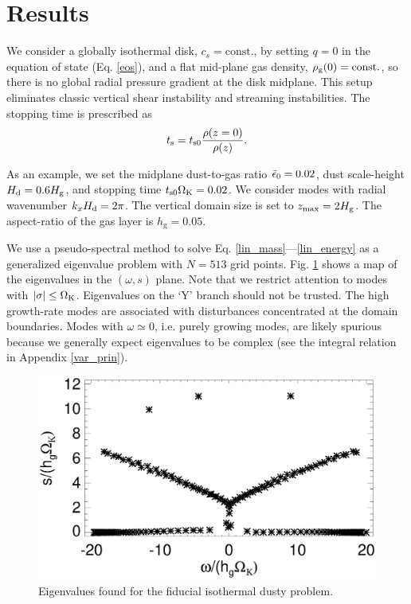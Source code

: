 \section{Results}

We consider a globally isothermal disk, $c_s=\mathrm{const.}$, by
setting $q=0$ in the equation of state (Eq. \ref{eos}), and a flat
mid-plane gas density, $\rho_\mathrm{g}(0) = \mathrm{const.}$, so there is no
global radial pressure gradient at the disk midplane. This setup
eliminates classic vertical shear instability and streaming
instabilities. The stopping time is
prescribed as 
\begin{align}
  t_\mathrm{s} = t_\mathrm{s0}\frac{\rho(z=0)}{\rho(z)}. 
\end{align}

As an example, we set the midplane dust-to-gas ratio 
$\tilde{\epsilon}_0=0.02$, dust scale-height $H_\mathrm{d}=0.6H_\mathrm{g}$, and
stopping time $t_\mathrm{s0}\Omega_{\rm K}=0.02$. We consider modes with radial
wavenumber $k_xH_\mathrm{d}=2\pi$. The vertical domain size is set to  
$z_\mathrm{max}=2H_\mathrm{g}$. The aspect-ratio of the gas layer is
$h_\mathrm{g}=0.05$. 

We use a pseudo-spectral method to solve  
Eq. \ref{lin_mass}---\ref{lin_energy} as a generalized eigenvalue
problem with $N=513$ grid points. Fig. \ref{eigen_map}   
shows a map of the eigenvalues in the $(\omega, s)$ plane. Note that
we restrict attention to modes with $|\sigma|\leq \Omega_{\rm K}$. 
Eigenvalues on the `Y' branch should not be trusted. The 
high growth-rate modes are associated with disturbances concentrated
at the domain boundaries. Modes with $\omega\simeq 0$, i.e. purely
growing modes, are likely spurious because we generally expect
eigenvalues to be complex (see the integral relation in Appendix
\ref{var_prin}).  

\begin{figure}
  \includegraphics[width=\linewidth]{figures/eigenvalues}
  \caption{Eigenvalues found for the fiducial isothermal dusty
    problem. 
  \label{eigen_map}} 
\end{figure}

